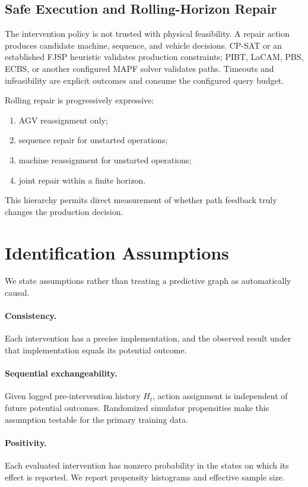 \documentclass[11pt,a4paper]{article}
\begin{document}
\subsection{Safe Execution and Rolling-Horizon Repair}

The intervention policy is not trusted with physical feasibility. A repair
action produces candidate machine, sequence, and vehicle decisions. CP-SAT or
an established FJSP heuristic validates production constraints; PIBT, LaCAM,
PBS, ECBS, or another configured MAPF solver validates paths. Timeouts and
infeasibility are explicit outcomes and consume the configured query budget.

Rolling repair is progressively expressive:
\begin{enumerate}[leftmargin=*]
    \item AGV reassignment only;
    \item sequence repair for unstarted operations;
    \item machine reassignment for unstarted operations;
    \item joint repair within a finite horizon.
\end{enumerate}
This hierarchy permits direct measurement of whether path feedback truly changes
the production decision.

\section{Identification Assumptions}
\label{sec:identification}

We state assumptions rather than treating a predictive graph as automatically
causal.

\paragraph{Consistency.}
Each intervention has a precise implementation, and the observed result under
that implementation equals its potential outcome.

\paragraph{Sequential exchangeability.}
Given logged pre-intervention history \(H_t\), action assignment is independent
of future potential outcomes. Randomized simulator propensities make this
assumption testable for the primary training data.

\paragraph{Positivity.}
Each evaluated intervention has nonzero probability in the states on which its
effect is reported. We report propensity histograms and effective sample size.
\end{document}
